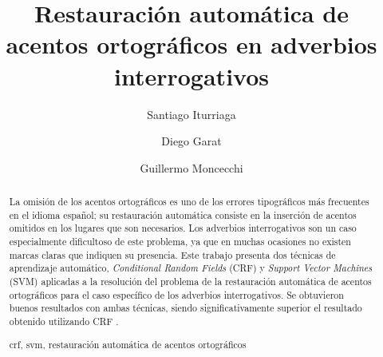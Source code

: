 \documentclass[runningheads,a4paper]{llncs}
\newcommand{\keywords}[1]{\par\addvspace\baselineskip
\noindent\keywordname\enspace\ignorespaces#1}
\begin{document}
\mainmatter  %

\title{Restauración automática de acentos ortográficos en adverbios interrogativos}


%
%
\author{Santiago Iturriaga \and Diego Garat \and Guillermo Moncecchi} 

%


%
%

\maketitle

\begin{abstract}
La omisión de los acentos ortográficos es uno de los errores tipográficos más frecuentes en el idioma español; su restauración automática consiste en la inserción de acentos  omitidos en los lugares que son necesarios. Los adverbios interrogativos son un caso especialmente dificultoso de este problema, ya que en muchas ocasiones no existen marcas claras que indiquen su presencia. Este trabajo presenta dos técnicas de aprendizaje automático, \emph{Conditional Random Fields} (CRF) y \emph{Support Vector Machines} (SVM) aplicadas a la resolución del problema de la restauración automática de acentos ortográficos para el caso específico de los adverbios interrogativos. Se obtuvieron buenos resultados con ambas t\'ecnicas, siendo significativamente superior el resultado obtenido utilizando CRF .
\keywords{crf, svm, restauración automática de acentos ortográficos}
\end{abstract}
\end{document}
